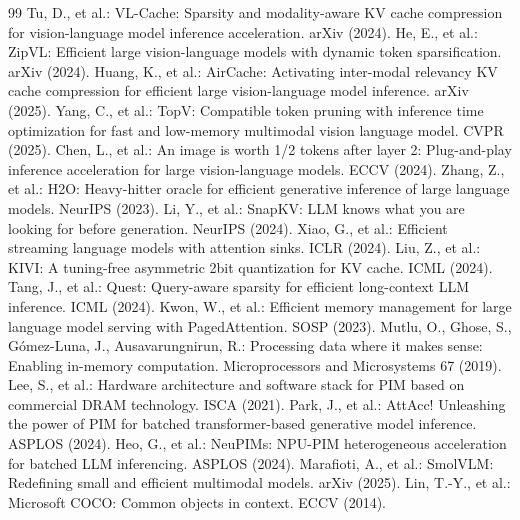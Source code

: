 \documentclass[10pt,a4paper]{article}
\begin{document}
\begin{thebibliography}{99}\small
{} Tu, D., et al.: VL-Cache: Sparsity and modality-aware KV cache compression for vision-language model inference acceleration. arXiv (2024).
 He, E., et al.: ZipVL: Efficient large vision-language models with dynamic token sparsification. arXiv (2024).
 Huang, K., et al.: AirCache: Activating inter-modal relevancy KV cache compression for efficient large vision-language model inference. arXiv (2025).
 Yang, C., et al.: TopV: Compatible token pruning with inference time optimization for fast and low-memory multimodal vision language model. CVPR (2025).
 Chen, L., et al.: An image is worth 1/2 tokens after layer 2: Plug-and-play inference acceleration for large vision-language models. ECCV (2024).
 Zhang, Z., et al.: H2O: Heavy-hitter oracle for efficient generative inference of large language models. NeurIPS (2023).
 Li, Y., et al.: SnapKV: LLM knows what you are looking for before generation. NeurIPS (2024).
 Xiao, G., et al.: Efficient streaming language models with attention sinks. ICLR (2024).
 Liu, Z., et al.: KIVI: A tuning-free asymmetric 2bit quantization for KV cache. ICML (2024).
 Tang, J., et al.: Quest: Query-aware sparsity for efficient long-context LLM inference. ICML (2024).
 Kwon, W., et al.: Efficient memory management for large language model serving with PagedAttention. SOSP (2023).
 Mutlu, O., Ghose, S., G\'omez-Luna, J., Ausavarungnirun, R.: Processing data where it makes sense: Enabling in-memory computation. Microprocessors and Microsystems 67 (2019).
 Lee, S., et al.: Hardware architecture and software stack for PIM based on commercial DRAM technology. ISCA (2021).
 Park, J., et al.: AttAcc! Unleashing the power of PIM for batched transformer-based generative model inference. ASPLOS (2024).
 Heo, G., et al.: NeuPIMs: NPU-PIM heterogeneous acceleration for batched LLM inferencing. ASPLOS (2024).
 Marafioti, A., et al.: SmolVLM: Redefining small and efficient multimodal models. arXiv (2025).
 Lin, T.-Y., et al.: Microsoft COCO: Common objects in context. ECCV (2014).
\end{thebibliography}


\appendix
\end{document}
